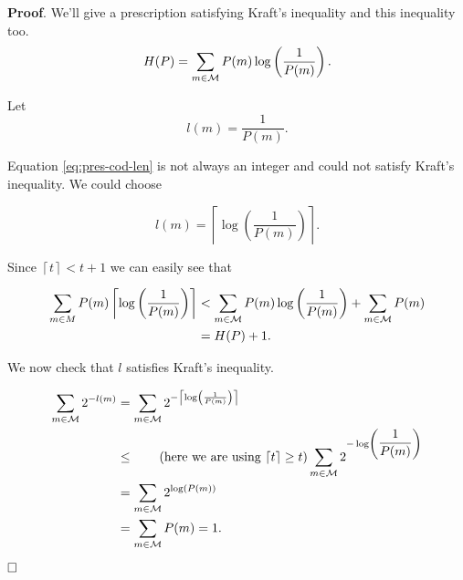 \noindent\textbf{Proof}. We'll give a prescription satisfying Kraft's inequality and this inequality too. 
\begin{equation}
 H(P) = \sum_{m \in \mathcal{M}} P(m)\log\left(\dfrac{1}{P(m)}\right). 
\end{equation}


Let
\begin{equation}\label{eq:pres-cod-len}
l(m) = \dfrac{1}{P(m)}. 
\end{equation}

Equation \ref{eq:pres-cod-len} is not always an integer and could not satisfy Kraft's inequality. We could choose

\begin{equation}
l(m) = \left\lceil\log\left(\dfrac{1}{P(m)}\right)\right\rceil.
\end{equation}


Since $\left\lceil t \right\rceil < t + 1$ we can easily see that 

\begin{align*}
\sum_{m \in M} P(m)\left\lceil\log\left(\dfrac{1}{P(m)}\right)\right\rceil & < \sum_{m \in \mathcal{M}} P(m)\log\left(\dfrac{1}{P(m)}\right) + \sum_{m \in \mathcal{M}} P(m)\\ & =  H(P) + 1. 
\end{align*}


We now check that $l$ satisfies Kraft's inequality.

\begin{align*}
\sum_{m \in \mathcal{M}} 2^{-l(m)} & = \sum_{m \in \mathcal{M}} 2^{-\left\lceil\log\left(\frac{1}{P(m)}\right)\right\rceil}\\ 
& \leq\tag{here we are using $\left\lceil t \right\rceil \geq t$}
 \sum_{m \in \mathcal{M}} 2^{-\log\left(\dfrac{1}{P(m)}\right)} \\ 
& = \sum_{m \in \mathcal{M}} 2^{\log(P(m))} \\
& = \sum_{m \in \mathcal{M}} P(m) = 1.
\end{align*}

$\hfill\Box$